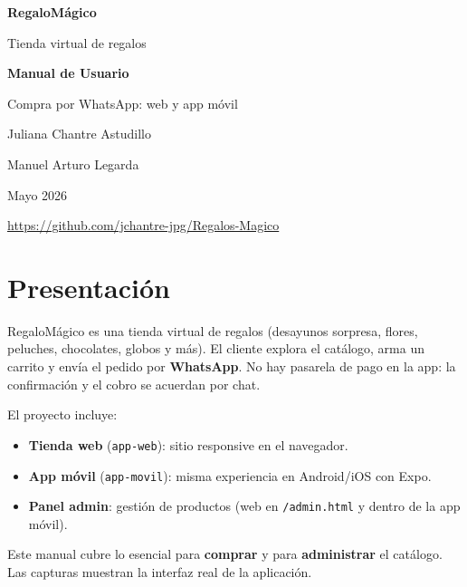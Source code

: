 \documentclass[11pt,a4paper,oneside,openany]{scrbook}
\newcommand{\app}{RegaloM\'agico}
\begin{document}
\begin{titlepage}
  \centering
  \vspace*{1.8cm}
  {\sffamily\fontsize{40}{46}\selectfont\bfseries\color{rmGold} RegaloM\'agico\par}
  \vspace{0.4cm}
  {\large Tienda virtual de regalos\par}
  \vspace{1cm}
  {\sffamily\Huge\bfseries Manual de Usuario\par}
  \vspace{0.6cm}
  {\large Compra por WhatsApp: web y app m\'ovil\par}
  \vfill
  {\sffamily\large Juliana Chantre Astudillo\par}
  {\sffamily\large Manuel Arturo Legarda\par}
  \vspace{0.6cm}
  {\sffamily Mayo 2026\par}
  \vspace{0.4cm}
  {\small\url{https://github.com/jchantre-jpg/Regalos-Magico}\par}
\end{titlepage}

\frontmatter
\chapter{Presentaci\'on}

\app{} es una tienda virtual de regalos (desayunos sorpresa, flores, peluches, chocolates, globos y m\'as). El cliente explora el cat\'alogo, arma un carrito y env\'ia el pedido por \textbf{WhatsApp}. No hay pasarela de pago en la app: la confirmaci\'on y el cobro se acuerdan por chat.

El proyecto incluye:
\begin{itemize}[noitemsep]
  \item \textbf{Tienda web} (\texttt{app-web}): sitio responsive en el navegador.
  \item \textbf{App m\'ovil} (\texttt{app-movil}): misma experiencia en Android/iOS con Expo.
  \item \textbf{Panel admin}: gesti\'on de productos (web en \texttt{/admin.html} y dentro de la app m\'ovil).
\end{itemize}

\begin{tipbox}
  Este manual cubre lo esencial para \textbf{comprar} y para \textbf{administrar} el cat\'alogo. Las capturas muestran la interfaz real de la aplicaci\'on.
\end{tipbox}
\end{document}
